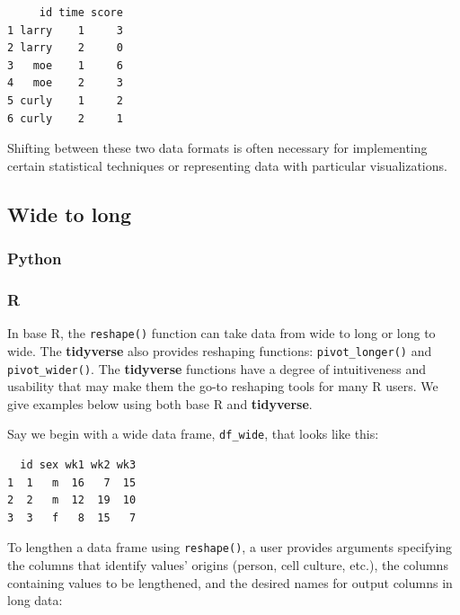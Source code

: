 \documentclass[
]{book}
\begin{document}
\begin{verbatim}
     id time score
1 larry    1     3
2 larry    2     0
3   moe    1     6
4   moe    2     3
5 curly    1     2
6 curly    2     1
\end{verbatim}

Shifting between these two data formats is often necessary for implementing certain statistical techniques or representing data with particular visualizations.

\hypertarget{wide-to-long}{%
\subsection{Wide to long}\label{wide-to-long}}

\hypertarget{python-25}{%
\subsubsection*{Python}\label{python-25}}

\hypertarget{r-25}{%
\subsubsection*{R}\label{r-25}}

In base R, the \texttt{reshape()} function can take data from wide to long or long to wide. The \textbf{tidyverse} also provides reshaping functions: \texttt{pivot\_longer()} and \texttt{pivot\_wider()}. The \textbf{tidyverse} functions have a degree of intuitiveness and usability that may make them the go-to reshaping tools for many R users. We give examples below using both base R and \textbf{tidyverse}.

Say we begin with a wide data frame, \texttt{df\_wide}, that looks like this:

\begin{verbatim}
  id sex wk1 wk2 wk3
1  1   m  16   7  15
2  2   m  12  19  10
3  3   f   8  15   7
\end{verbatim}

To lengthen a data frame using \texttt{reshape()}, a user provides arguments specifying the columns that identify values' origins (person, cell culture, etc.), the columns containing values to be lengthened, and the desired names for output columns in long data:
\end{document}
